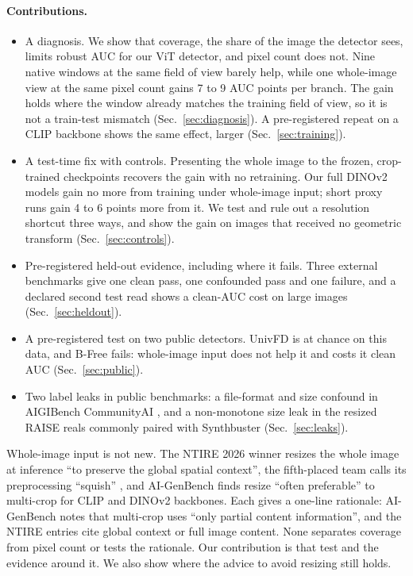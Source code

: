 \documentclass[letterpaper]{article} %
\begin{document}
\paragraph{Contributions.}
\begin{itemize}
\item A diagnosis. We show that coverage, the share of the image the
  detector sees, limits robust AUC for our ViT detector, and pixel count does
  not. Nine native windows at the same field of view barely help, while one
  whole-image view at the same pixel count gains 7 to 9 AUC points per
  branch. The gain holds where the window already matches the training field
  of view, so it is not a train-test mismatch (Sec.~\ref{sec:diagnosis}). A
  pre-registered repeat on a CLIP backbone shows the same effect, larger
  (Sec.~\ref{sec:training}).
\item A test-time fix with controls. Presenting the whole image to the frozen,
  crop-trained checkpoints recovers the gain with no retraining. Our full
  DINOv2 models gain no more from training under whole-image input; short
  proxy runs gain 4 to 6 points more from it. We test and rule out a
  resolution shortcut three ways, and show the gain on images that received
  no geometric transform (Sec.~\ref{sec:controls}).
\item Pre-registered held-out evidence, including where it fails. Three
  external benchmarks give one clean pass, one confounded pass and one
  failure, and a declared second test read shows a clean-AUC cost on large
  images (Sec.~\ref{sec:heldout}).
\item A pre-registered test on two public detectors. UnivFD is at chance on
  this data, and B-Free fails: whole-image input does not help it and costs
  it clean AUC (Sec.~\ref{sec:public}).
\item Two label leaks in public benchmarks: a file-format and size confound in
  AIGIBench CommunityAI \cite{li2025aigibench}, and a non-monotone size leak in
  the resized RAISE reals commonly paired with
  Synthbuster \cite{bammey2024synthbuster} (Sec.~\ref{sec:leaks}).
\end{itemize}

Whole-image input is not new. The NTIRE 2026 winner resizes the whole image at
inference ``to preserve the global spatial context'', the fifth-placed team
calls its preprocessing ``squish'' \cite{gushchin2026ntire}, and
AI-GenBench \cite{pellegrini2025aigenbench} finds resize ``often preferable''
to multi-crop for CLIP and DINOv2 backbones. Each gives a one-line rationale:
AI-GenBench notes that multi-crop uses ``only partial content information'',
and the NTIRE entries cite global context or full image content. None
separates coverage from pixel count or tests the rationale. Our contribution
is that test and the evidence around it. We also show where the advice to avoid resizing still holds.
\end{document}
